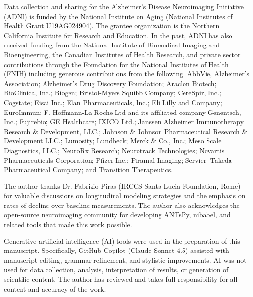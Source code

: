 \documentclass[blue]{ludusofficial}
\begin{document}
\begin{acknowledgments}
Data collection and sharing for the Alzheimer's Disease Neuroimaging Initiative (ADNI) is funded by the National Institute on Aging (National Institutes of Health Grant U19AG024904). The grantee organization is the Northern California Institute for Research and Education. In the past, ADNI has also received funding from the National Institute of Biomedical Imaging and Bioengineering, the Canadian Institutes of Health Research, and private sector contributions through the Foundation for the National Institutes of Health (FNIH) including generous contributions from the following: AbbVie, Alzheimer's Association; Alzheimer's Drug Discovery Foundation; Araclon Biotech; BioClinica, Inc.; Biogen; Bristol-Myers Squibb Company; CereSpir, Inc.; Cogstate; Eisai Inc.; Elan Pharmaceuticals, Inc.; Eli Lilly and Company; EuroImmun; F. Hoffmann-La Roche Ltd and its affiliated company Genentech, Inc.; Fujirebio; GE Healthcare; IXICO Ltd.; Janssen Alzheimer Immunotherapy Research \& Development, LLC.; Johnson \& Johnson Pharmaceutical Research \& Development LLC.; Lumosity; Lundbeck; Merck \& Co., Inc.; Meso Scale Diagnostics, LLC.; NeuroRx Research; Neurotrack Technologies; Novartis Pharmaceuticals Corporation; Pfizer Inc.; Piramal Imaging; Servier; Takeda Pharmaceutical Company; and Transition Therapeutics.

The author thanks Dr. Fabrizio Piras (IRCCS Santa Lucia Foundation, Rome) for valuable discussions on longitudinal modeling strategies and the emphasis on rates of decline over baseline measurements. The author also acknowledges the open-source neuroimaging community for developing ANTsPy, nibabel, and related tools that made this work possible.

Generative artificial intelligence (AI) tools were used in the preparation of this manuscript. Specifically, GitHub Copilot (Claude Sonnet 4.5) assisted with manuscript editing, grammar refinement, and stylistic improvements. AI was not used for data collection, analysis, interpretation of results, or generation of scientific content. The author has reviewed and takes full responsibility for all content and accuracy of the work.
\end{acknowledgments}



\end{document}
